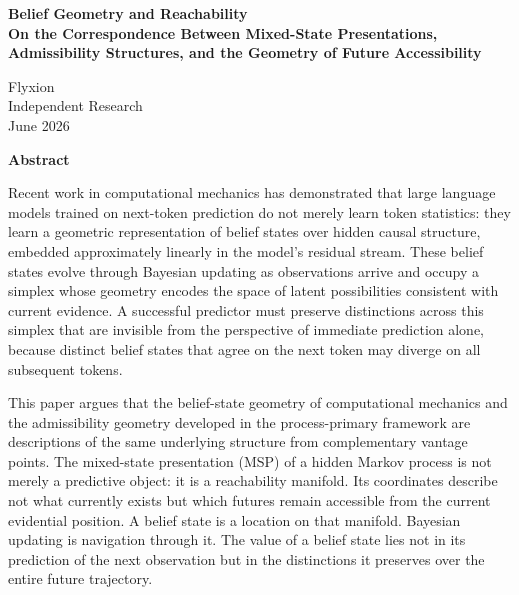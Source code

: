 \documentclass[12pt, a4paper]{article}
\theoremstyle{plain}
\theoremstyle{definition}
\theoremstyle{remark}
\begin{document}

\begin{titlepage}
\centering
\vspace*{2.5cm}
{\LARGE\bfseries Belief Geometry and Reachability\\[0.6em]
\large On the Correspondence Between Mixed-State Presentations,\\
Admissibility Structures, and the Geometry of Future Accessibility\par}
\vspace{2.5cm}
{\large Flyxion}\\[0.5em]
{\normalsize Independent Research}\\[1em]
{\normalsize June 2026}
\end{titlepage}

\newpage
\thispagestyle{empty}
\begin{center}
{\large\bfseries Abstract}
\end{center}
\vspace{0.5em}
\noindent
Recent work in computational mechanics has demonstrated that large language
models trained on next-token prediction do not merely learn token statistics:
they learn a geometric representation of belief states over hidden causal
structure, embedded approximately linearly in the model's residual stream.
These belief states evolve through Bayesian updating as observations arrive
and occupy a simplex whose geometry encodes the space of latent possibilities
consistent with current evidence. A successful predictor must preserve
distinctions across this simplex that are invisible from the perspective of
immediate prediction alone, because distinct belief states that agree on the
next token may diverge on all subsequent tokens.

This paper argues that the belief-state geometry of computational mechanics
and the admissibility geometry developed in the process-primary framework are
descriptions of the same underlying structure from complementary vantage
points. The mixed-state presentation (MSP) of a hidden Markov process is not
merely a predictive object: it is a reachability manifold. Its coordinates
describe not what currently exists but which futures remain accessible from
the current evidential position. A belief state is a location on that manifold.
Bayesian updating is navigation through it. The value of a belief state lies
not in its prediction of the next observation but in the distinctions it
preserves over the entire future trajectory.
\end{document}
